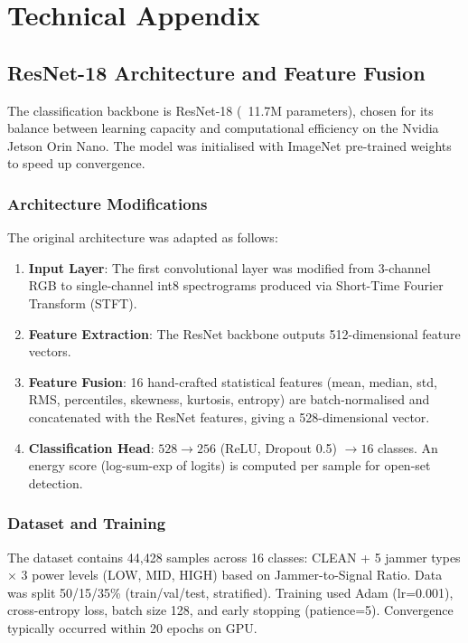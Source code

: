 \section{Technical Appendix}

\subsection{ResNet-18 Architecture and Feature Fusion}

The classification backbone is ResNet-18 (~11.7M parameters), chosen for its balance between learning capacity and computational efficiency on the Nvidia Jetson Orin Nano. The model was initialised with ImageNet pre-trained weights to speed up convergence.

\subsubsection{Architecture Modifications}

The original architecture was adapted as follows:

\begin{enumerate}
    \item \textbf{Input Layer}: The first convolutional layer was modified from 3-channel RGB to single-channel int8 spectrograms produced via Short-Time Fourier Transform (STFT).
    \item \textbf{Feature Extraction}: The ResNet backbone outputs 512-dimensional feature vectors.
    \item \textbf{Feature Fusion}: 16 hand-crafted statistical features (mean, median, std, RMS, percentiles, skewness, kurtosis, entropy) are batch-normalised and concatenated with the ResNet features, giving a 528-dimensional vector.
    \item \textbf{Classification Head}: $528 \rightarrow 256$ (ReLU, Dropout 0.5) $\rightarrow 16$ classes. An energy score (log-sum-exp of logits) is computed per sample for open-set detection.
\end{enumerate}

\subsubsection{Dataset and Training}

The dataset contains 44,428 samples across 16 classes: CLEAN + 5 jammer types $\times$ 3 power levels (LOW, MID, HIGH) based on Jammer-to-Signal Ratio. Data was split 50/15/35\% (train/val/test, stratified). Training used Adam (lr=0.001), cross-entropy loss, batch size 128, and early stopping (patience=5). Convergence typically occurred within 20 epochs on GPU.

